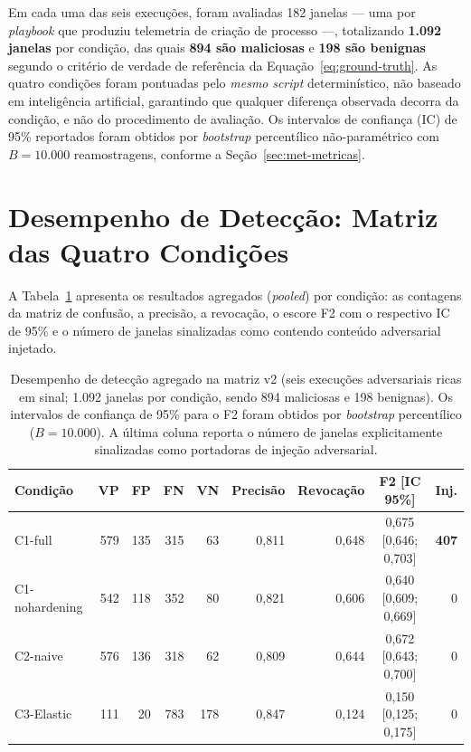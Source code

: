 Em cada uma das seis execuções, foram avaliadas 182 janelas --- uma por
\textit{playbook} que produziu telemetria de criação de processo ---,
totalizando \textbf{1.092 janelas} por condição, das quais
\textbf{894 são maliciosas} e \textbf{198 são benignas} segundo o critério de
verdade de referência da Equação~\ref{eq:ground-truth}. As quatro condições
foram pontuadas pelo \emph{mesmo} \textit{script} determinístico, não baseado em
inteligência artificial, garantindo que qualquer diferença observada decorra da
condição, e não do procedimento de avaliação. Os intervalos de confiança (IC)
de 95\% reportados foram obtidos por \textit{bootstrap} percentílico
não-paramétrico com $B = 10.000$ reamostragens, conforme a
Seção~\ref{sec:met-metricas}.

\section{Desempenho de Detecção: Matriz das Quatro Condições}
\label{sec:res-deteccao}

A Tabela~\ref{tab:resultados-condicoes} apresenta os resultados agregados
(\textit{pooled}) por condição: as contagens da matriz de confusão, a precisão,
a revocação, o escore F2 com o respectivo IC de 95\% e o número de janelas
sinalizadas como contendo conteúdo adversarial injetado.

\begin{table}[H]
\centering
\caption{Desempenho de detecção agregado na matriz v2 (seis execuções
adversariais ricas em sinal; 1.092 janelas por condição, sendo 894 maliciosas e
198 benignas). Os intervalos de confiança de 95\% para o F2 foram obtidos por
\textit{bootstrap} percentílico ($B = 10.000$). A última coluna reporta o número
de janelas explicitamente sinalizadas como portadoras de injeção adversarial.}
\label{tab:resultados-condicoes}
\begin{tabular}{lrrrrrrcr}
\toprule
Condição & VP & FP & FN & VN & Precisão & Revocação & F2 [IC 95\%] & Inj. \\
\midrule
C1-full          & 579 & 135 & 315 & 63 & 0,811 & 0,648 & 0,675 [0,646; 0,703] & \textbf{407} \\
C1-nohardening   & 542 & 118 & 352 & 80 & 0,821 & 0,606 & 0,640 [0,609; 0,669] & 0 \\
C2-naive         & 576 & 136 & 318 & 62 & 0,809 & 0,644 & 0,672 [0,643; 0,700] & 0 \\
C3-Elastic       & 111 &  20 & 783 & 178 & 0,847 & 0,124 & 0,150 [0,125; 0,175] & 0 \\
\bottomrule
\end{tabular}
\end{table}

